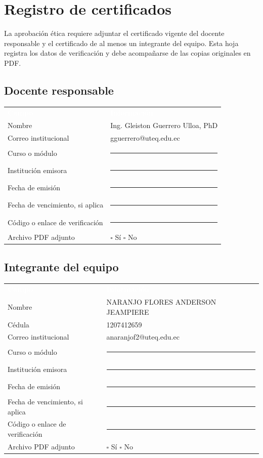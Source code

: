 \documentclass[10.5pt,a4paper]{article}
\makeatletter
\newcommand{\Docente}{Ing. Gleiston Guerrero Ulloa, PhD}
\newcommand{\CorreoDocente}{gguerrero@uteq.edu.ec}
\newcommand{\Integrante}{NARANJO FLORES ANDERSON JEAMPIERE}
\newcommand{\CedulaIntegrante}{1207412659}
\newcommand{\CorreoIntegrante}{anaranjof2@uteq.edu.ec}
\makeatother
\begin{document}
\section{Registro de certificados}

La aprobación ética requiere adjuntar el certificado vigente del docente responsable y el certificado de al menos un integrante del equipo. Esta hoja registra los datos de verificación y debe acompañarse de las copias originales en PDF.

\subsection*{Docente responsable}
\begin{tabularx}{\textwidth}{L{5.0cm} Y}
\textcolor{white}{\textbf{Campo}} & \textcolor{white}{\textbf{Información}}\\
Nombre & \Docente\\
Correo institucional & \CorreoDocente\\
Curso o módulo & \rule{9.5cm}{0.35pt}\\
Institución emisora & \rule{9.5cm}{0.35pt}\\
Fecha de emisión & \rule{4.0cm}{0.35pt}\\
Fecha de vencimiento, si aplica & \rule{4.0cm}{0.35pt}\\
Código o enlace de verificación & \rule{9.5cm}{0.35pt}\\
Archivo PDF adjunto & $\square$ Sí \hspace{1.2cm} $\square$ No\\
\end{tabularx}

\vspace{0.55cm}
\subsection*{Integrante del equipo}
\begin{tabularx}{\textwidth}{L{5.0cm} Y}
\textcolor{white}{\textbf{Campo}} & \textcolor{white}{\textbf{Información}}\\
Nombre & \Integrante\\
Cédula & \CedulaIntegrante\\
Correo institucional & \CorreoIntegrante\\
Curso o módulo & \rule{9.5cm}{0.35pt}\\
Institución emisora & \rule{9.5cm}{0.35pt}\\
Fecha de emisión & \rule{4.0cm}{0.35pt}\\
Fecha de vencimiento, si aplica & \rule{4.0cm}{0.35pt}\\
Código o enlace de verificación & \rule{9.5cm}{0.35pt}\\
Archivo PDF adjunto & $\square$ Sí \hspace{1.2cm} $\square$ No\\
\end{tabularx}
\end{document}
